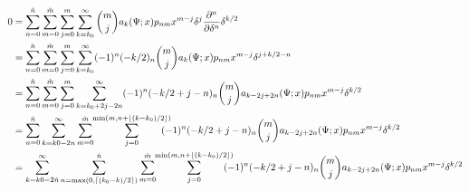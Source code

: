 \documentclass[a4paper,10pt,fleqn]{scrartcl}
\begin{document}
    \begin{align*}
        0
        &=
        \sum_{n=0}^{\hat n}
        \sum_{m=0}^{\hat m}
        \sum_{j=0}^m
        \sum_{k=k_0}^\infty
        \binom{m}{j}
        a_k(\Psi;x)
        p_{nm} x^{m-j}
        \delta^j
        \frac{\partial^n}{\partial \delta^n}
        \delta^{k/2}
        \\
        &=
        \sum_{n=0}^{\hat n}
        \sum_{m=0}^{\hat m}
        \sum_{j=0}^m
        \sum_{k=k_0}^\infty
        (-1)^n
        (-k/2)_n
        \binom{m}{j}
        a_k(\Psi;x)
        p_{nm} x^{m-j}
        \delta^{j+k/2-n}
        \\
        &=
        \sum_{n=0}^{\hat n}
        \sum_{m=0}^{\hat m}
        \sum_{j=0}^m
        \sum_{k=k_0+2j-2n}^\infty
        (-1)^n
        (-k/2+j-n)_n
        \binom{m}{j}
        a_{k-2j+2n}(\Psi;x)
        p_{nm} x^{m-j}
        \delta^{k/2}
        \\
        &=
        \sum_{n=0}^{\hat n}
        \sum_{k=k0-2n}^\infty
        \sum_{m=0}^{\hat m}
        \hspace{-3pt}
        \sum_{j=0}^{\min\left(m,n+\lfloor (k-k_0)/2 \rfloor\right)}
        \hspace{-10pt}
        (-1)^n
        (-k/2+j-n)_n
        \binom{m}{j}
        a_{k-2j+2n}(\Psi;x)
        p_{nm} x^{m-j}
        \delta^{k/2}
        \\
        &=
        \sum_{k=k0-2\hat n}^\infty
        \sum_{n=\max\left(0,\lceil (k_0-k)/2 \rceil\right)}^{\hat n}
        \sum_{m=0}^{\hat m}
        \hspace{-3pt}
        \sum_{j=0}^{\min\left(m,n+\lfloor (k-k_0)/2 \rfloor\right)}
        \hspace{-10pt}
        (-1)^n
        (-k/2+j-n)_n
        \binom{m}{j}
        a_{k-2j+2n}(\Psi;x)
        p_{nm} x^{m-j}
        \delta^{k/2}
    \end{align*}
\end{document}
